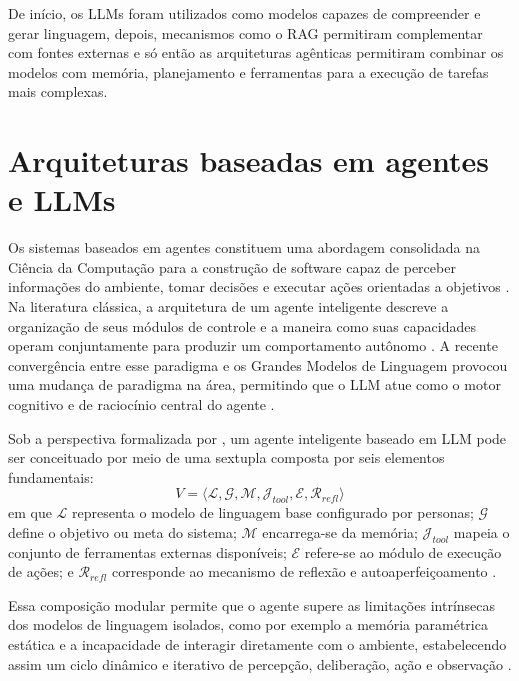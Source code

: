 De início, os LLMs foram utilizados como modelos capazes de compreender e gerar linguagem, depois, mecanismos como o RAG permitiram complementar com fontes externas e só então as arquiteturas agênticas permitiram combinar os modelos com memória, planejamento e ferramentas para a execução de tarefas mais complexas. 

\section{Arquiteturas baseadas em agentes e LLMs}


Os sistemas baseados em agentes constituem uma abordagem consolidada na Ciência da Computação para a construção de software capaz de perceber informações do ambiente, tomar decisões e executar ações orientadas a objetivos \cite{muller1999}. Na literatura clássica, a arquitetura de um agente inteligente descreve a organização de seus módulos de controle e a maneira como suas capacidades operam conjuntamente para produzir um comportamento autônomo \cite{muller1999, russell2022artificial}. A recente convergência entre esse paradigma e os Grandes Modelos de Linguagem provocou uma mudança de paradigma na área, permitindo que o LLM atue como o motor cognitivo e de raciocínio central do agente \cite{cheng2026, zhao2026survey}.

Sob a perspectiva formalizada por , um agente inteligente baseado em LLM pode ser conceituado por meio de uma sextupla composta por seis elementos fundamentais: \begin{equation} \label{eq:sextupla_agente} V = \langle \mathcal{L}, \mathcal{G}, \mathcal{M}, \mathcal{J}_{tool}, \mathcal{E}, \mathcal{R}_{refl} \rangle \end{equation} em que $\mathcal{L}$ representa o modelo de linguagem base configurado por personas; $\mathcal{G}$ define o objetivo ou meta do sistema; $\mathcal{M}$ encarrega-se da memória; $\mathcal{J}_{tool}$ mapeia o conjunto de ferramentas externas disponíveis; $\mathcal{E}$ refere-se ao módulo de execução de ações; e $\mathcal{R}_{refl}$ corresponde ao mecanismo de reflexão e autoaperfeiçoamento \cite{cheng2026}.

Essa composição modular permite que o agente supere as limitações intrínsecas dos modelos de linguagem isolados, como por exemplo a memória paramétrica estática e a incapacidade de interagir diretamente com o ambiente, estabelecendo assim um ciclo dinâmico e iterativo de percepção, deliberação, ação e observação \cite{cheng2026, zhao2026survey}.


